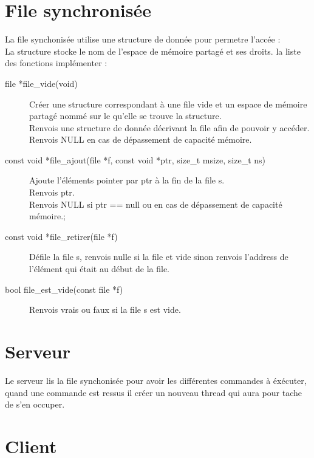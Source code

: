 \documentclass[12pt]{article}
\begin{document}
\section{File synchronisée}
    La file synchonisée utilise une structure de donnée pour permetre l'accée :\\
    La structure stocke le nom de l'espace de mémoire partagé et ses droits.
    la liste des fonctions implémenter :
    \begin{description}
        \item [file *file\_vide(void)] Créer une structure correspondant à une file vide et un espace de mémoire partagé nommé sur le qu'elle se trouve la structure.\\
        Renvois une structure de donnée décrivant la file afin de pouvoir y accéder.\\
        Renvois NULL en cas de dépassement de capacité mémoire.
        \item [const void *file\_ajout(file *f, const void *ptr, size\_t msize, size\_t ns)]  Ajoute l'éléments pointer par ptr à la fin de la file s.\\
        Renvois ptr.\\
        Renvois NULL si ptr == null ou en cas de dépassement de capacité mémoire.;
        \item [const void *file\_retirer(file *f)] Défile la file s, renvois nulle si la file et vide sinon renvois l'address de l'élément qui était au début de la file.
        \item [bool file\_est\_vide(const file *f)] Renvois vrais ou faux si la file s est vide.
    \end{description}

\newpage
\section{Serveur}
    Le serveur lis la file synchonisée pour avoir les différentes commandes à éxécuter, quand une commande est ressus il créer un nouveau thread qui aura pour tache de s'en occuper.

\newpage
\section{Client}
\end{document}
